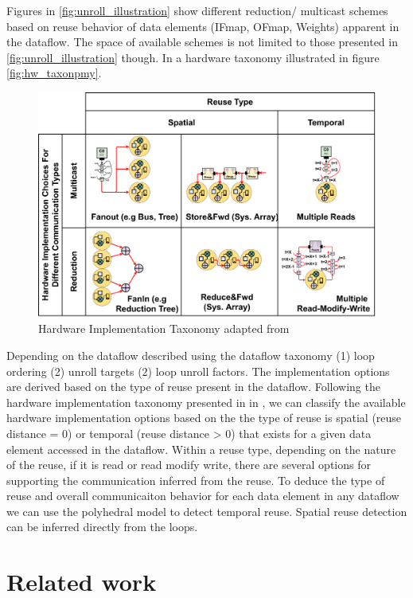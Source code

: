 Figures in \autoref{fig:unroll_illustration} show different reduction/ multicast
schemes based on reuse behavior of data elements (IFmap, OFmap, Weights)
apparent in the dataflow. The space of available schemes is not limited to those
presented in \autoref{fig:unroll_illustration} though. In \cite{maestro} a
hardware taxonomy illustrated in figure \autoref{fig:hw_taxonpmy}.

\begin{figure}[ht]
    \centering
    \includegraphics[scale=0.58]{fig/hw_taxonomy.pdf}
    \caption{Hardware Implementation Taxonomy adapted from \cite{maestro}}
    \label{fig:hw_taxonomy}
\end{figure}


Depending on the dataflow described using the dataflow taxonomy (1) loop
ordering (2) unroll targets (2) loop unroll factors. The implementation options
are derived based on the type of reuse present in the dataflow. Following the
hardware implementation taxonomy presented in in \cite{maestro}, we can classify
the available hardware implementation options based on the the type of reuse is
spatial (reuse distance = 0) or temporal (reuse distance > 0) that exists for a
given data element accessed in the dataflow. Within a reuse type, depending on
the nature of the reuse, if it is read or read modify write, there are several
options for supporting the communication inferred from the reuse. To deduce the
type of reuse and overall communicaiton behavior for each data element in any
dataflow we can use the polyhedral model to detect temporal reuse. Spatial reuse
detection can be inferred directly from the loops.


\section{Related work}
\label{chap:related_work}

